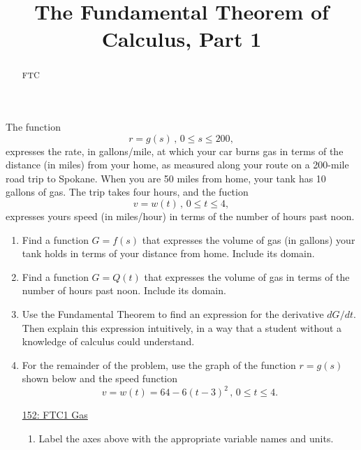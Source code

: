 \documentclass{ximera}
\title{The Fundamental Theorem of Calculus, Part 1}
\begin{document}
\begin{abstract}
FTC
\end{abstract}
\maketitle


\begin{question} \label{QoODROOOD}

The function
\[
 r =g(s) \, , \, 0\leq s \leq 200 ,
\]
 expresses the rate, in gallons/mile, at which your car burns gas in terms of the distance (in miles) from your home, as measured along your route on a 200-mile road trip to Spokane. When you are 50 miles from home, your tank has 10 gallons of gas. The trip takes four hours, and the fuction
\[
 v =w(t) \, , \, 0 \leq t \leq 4,
 \]
expresses yours speed (in miles/hour) in terms of the number of hours past noon.

\begin{enumerate}

\item Find a function $G = f(s)$ that expresses the volume of gas (in gallons) your tank holds in terms of your distance from home. Include its domain.

\item Find a function $G = Q(t)$ that expresses the volume of gas in terms of the number of hours past noon. Include its
 domain.

\item Use the Fundamental Theorem to find an expression for the derivative $dG/dt$. Then explain this expression intuitively, in a way that a student without a knowledge of calculus could understand.

\item For the remainder of the problem, use the graph of the function $r = g(s)$ shown below and the speed function
\[
 v =w(t) = 64 - 6(t-3)^2 \, , \, 0 \leq t \leq 4. 
\]

\begin{onlineOnly}
    \begin{center}
\end{center}
\end{onlineOnly}

\href{https://www.desmos.com/calculator/tzmqpsznou}{152: FTC1 Gas}


\begin{enumerate}
\item Label the axes above with the appropriate variable names and units.


\end{enumerate}
\end{enumerate}
\end{question}
\end{document}
